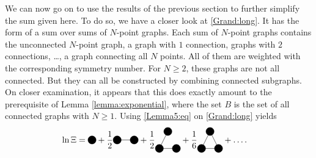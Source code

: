 \documentclass[8.5pt,twoside,twocolumn]{article}
\theoremstyle{standard}
\begin{document}
We can now go on to use the results of the previous section to further simplify the
sum given here. To do so, we have a closer look at \eqref{Grand:long}. It has the form of
a sum over sums of $N$-point graphs. Each sum of $N$-point graphs contains the unconnected $N$-point
graph, a graph with $1$ connection, graphs with $2$ connections, \ldots, a graph connecting all $N$ points.
All of them are weighted with the corresponding symmetry number. For $N \ge 2$, these graphs are not all
connected. But they can all be constructed by combining connected subgraphs. On closer examination, it appears that
this does exactly amount to the prerequisite of Lemma \ref{lemma:exponential}, where the set $B$ is the
set of all connected graphs with $N \ge 1$. Using \eqref{Lemma5:eq} on \eqref{Grand:long} yields
\begin{equation}
\begin{aligned}
\ln \Xi&=
\begin{tikzpicture}[baseline={([yshift=-.3em]current bounding box.center)}]
  \draw(0,0) node[circle,minimum size=.2cm,draw,fill=black] (A) {};
\end{tikzpicture}
+
\frac 1 2
\begin{tikzpicture}[baseline={([yshift=-.3em]current bounding box.center)}]
  \draw(0,0) node[circle,minimum size=.2cm,draw,fill=black] (A) {};
  \draw(.7,0) node[circle,minimum size=.2cm,draw,fill=black] (B) {};
  \draw (A.center) --  (B.center);
\end{tikzpicture}
+\frac 1 2
\begin{tikzpicture}[baseline={([yshift=-.3em]current bounding box.center)}]
  \draw(0,0) node[circle,minimum size=.2cm,draw,fill=black] (A) {};
  \draw(.7,0) node[circle,minimum size=.2cm,draw,fill=black] (B) {};
  \draw(.35,.7) node[circle,minimum size=.2cm,draw,fill=black] (C) {};
  \draw (A.center) --  (B.center);
  \draw (A.center) --  (C.center);
\end{tikzpicture}
+
\frac 1 6
\begin{tikzpicture}[baseline={([yshift=-.3em]current bounding box.center)}]
  \draw(0,0) node[circle,minimum size=.2cm,draw,fill=black] (A) {};
  \draw(.7,0) node[circle,minimum size=.2cm,draw,fill=black] (B) {};
  \draw(.35,.7) node[circle,minimum size=.2cm,draw,fill=black] (C) {};
  \draw (A.center) --  (B.center);
  \draw (A.center) --  (C.center);
  \draw (B.center) --  (C.center);
\end{tikzpicture}
 + \ldots .

\end{aligned}
\end{equation}
\end{document}

